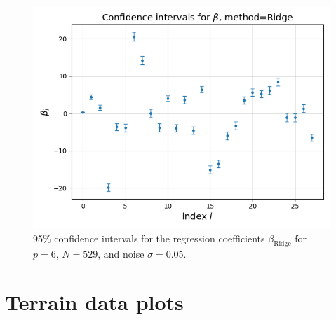 \documentclass[a4paper]{article}
\begin{document}
\begin{figure}[H]
	\centering
	\includegraphics[scale=0.5]{../figures/task_d/beta_conf_int_Ridge_N529_pmax20_nlamb20_noise0.05_seed4155_beta28.png}
	\caption{95\% confidence intervals for the regression coefficients $\beta_{\text{Ridge}}$ for $p=6$, $N=529$, and noise $\sigma=0.05$.}
	\label{fig:beta_ridge}
\end{figure}
\section{Terrain data plots} \label{app:terrainplots}
\end{document}
